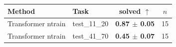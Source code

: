 \begin{tabular}{llcc}
\toprule
Method & Task & solved $\uparrow$ & $n$ \\
\midrule
Transformer ntrain & test\_11\_20 & \textbf{0.87 $\pm$ 0.05} & 15 \\
\midrule
Transformer ntrain & test\_41\_70 & \textbf{0.45 $\pm$ 0.07} & 15 \\
\bottomrule
\end{tabular}
